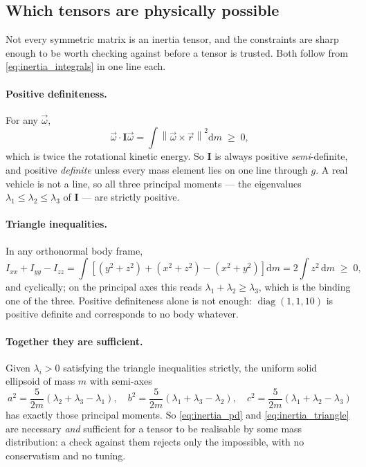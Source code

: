 \subsection{Which tensors are physically possible}\label{sec:3d_admissibility}
Not every symmetric matrix is an inertia tensor, and the constraints are sharp enough to be worth
checking against before a tensor is trusted. Both follow from \autoref{eq:inertia_integrals} in one
line each.

\paragraph{Positive definiteness.} For any $\vec\omega$,
\begin{equation} \label{eq:inertia_pd}
    \vec\omega\cdot\mathbf{I}\vec\omega
        = \int\left\lVert\vec\omega\times\vec{r}\right\rVert^2\mathrm{d}m \;\ge\; 0,
\end{equation}
which is twice the rotational kinetic energy. So $\mathbf{I}$ is always positive
\emph{semi}-definite, and positive \emph{definite} unless every mass element lies on one line
through $g$. A real vehicle is not a line, so all three principal moments --- the eigenvalues
$\lambda_1\le\lambda_2\le\lambda_3$ of $\mathbf{I}$ --- are strictly positive.

\paragraph{Triangle inequalities.} In any orthonormal body frame,
\begin{equation} \label{eq:inertia_triangle}
    I_{xx} + I_{yy} - I_{zz} = \int\left[\left(y^2+z^2\right)+\left(x^2+z^2\right)
        -\left(x^2+y^2\right)\right]\mathrm{d}m = 2\!\int\! z^2\,\mathrm{d}m \;\ge\; 0,
\end{equation}
and cyclically; on the principal axes this reads $\lambda_1+\lambda_2\ge\lambda_3$, which is the
binding one of the three. Positive definiteness alone is not enough: $\operatorname{diag}(1,1,10)$
is positive definite and corresponds to no body whatever.

\paragraph{Together they are sufficient.} Given $\lambda_i>0$ satisfying the triangle inequalities
strictly, the uniform solid ellipsoid of mass $m$ with semi-axes
\begin{equation} \label{eq:inertia_ellipsoid}
    a^2 = \frac{5}{2m}\left(\lambda_2+\lambda_3-\lambda_1\right), \quad
    b^2 = \frac{5}{2m}\left(\lambda_1+\lambda_3-\lambda_2\right), \quad
    c^2 = \frac{5}{2m}\left(\lambda_1+\lambda_2-\lambda_3\right)
\end{equation}
has exactly those principal moments. So \autoref{eq:inertia_pd} and \autoref{eq:inertia_triangle}
are necessary \emph{and} sufficient for a tensor to be realisable by some mass distribution: a
check against them rejects only the impossible, with no conservatism and no tuning.

